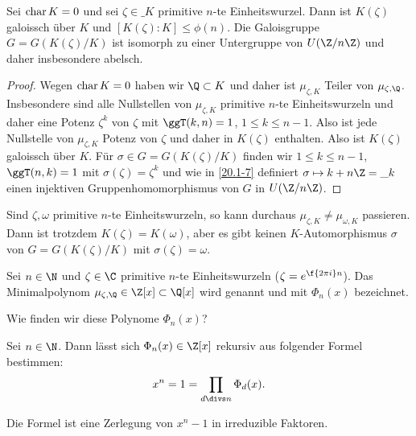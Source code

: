\begin{kor} \label{20.1-8}
	Sei $\operatorname{char} K = 0$ und sei $\zeta \in \_K$ primitive $n$-te Einheitswurzel.
	Dann ist $K(\zeta)$ galoissch über $K$ und $[K(\zeta) : K] \le \phi(n)$.
	Die Galoisgruppe $G = G(K(\zeta) / K)$ ist isomorph zu einer Untergruppe von $U(\Z / n\Z)$ und daher insbesondere abelsch.
	\begin{proof}
		Wegen $\operatorname{char} K = 0$ haben wir $\Q \subset K$ und daher ist $\mu_{\zeta,K}$ Teiler von $\mu_{\zeta, \Q}$.
		Insbesondere sind alle Nullstellen von $\mu_{\zeta, K}$ primitive $n$-te Einheitswurzeln und daher eine Potenz $\zeta^k$ von $\zeta$ mit $\ggT(k,n) = 1$, $1 \le k \le n-1$.
		Also ist jede Nullstelle von $\mu_{\zeta, K}$ Potenz von $\zeta$ und daher in $K(\zeta)$ enthalten.
		Also ist $K(\zeta)$ galoissch über $K$.
		Für $\sigma \in G = G(K(\zeta) / K)$ finden wir $1 \le k \le n-1$, $\ggT(n,k) = 1$ mit $\sigma(\zeta) = \zeta^k$ und wie in \ref{20.1-7} definiert $\sigma \mapsto k + n \Z = \_k$ einen injektiven Gruppenhomomorphismus von $G$ in $U(\Z / n\Z)$.
	\end{proof}
	\begin{note}
		Sind $\zeta, \omega$ primitive $n$-te Einheitswurzeln, so kann durchaus $\mu_{\zeta, K} \neq \mu_{\omega, K}$ passieren.
		Dann ist trotzdem $K(\zeta) = K(\omega)$, aber es gibt keinen $K$-Automorphismus $\sigma$ von $G = G(K(\zeta) / K)$ mit $\sigma(\zeta) = \omega$.
	\end{note}
\end{kor}

\begin{df} \label{20.1-9}
	Sei $n \in \N$ und $\zeta \in \C$ primitive $n$-te Einheitswurzeln (\oBdA $\zeta = e^{\f{2\pi i}n}$).
	Das Minimalpolynom $\mu_{\zeta, \Q} \in \Z[x] \subset \Q[x]$ wird  genannt und mit $\Phi_n(x)$ bezeichnet.
\end{df}

Wie finden wir diese Polynome $\Phi_n(x)$?

\begin{st} \label{20.1-10}
	Sei $n \in \N$.
	Dann lässt sich $\Phi_n(x) \in \Z[x]$ rekursiv aus folgender Formel bestimmen:
	\[
		x^n = 1 = \prod_{d \divs n} \Phi_d(x).
	\]
	\begin{note}
		Die Formel ist eine Zerlegung von $x^n - 1$ in irreduzible Faktoren.
	\end{note}
\end{st}

